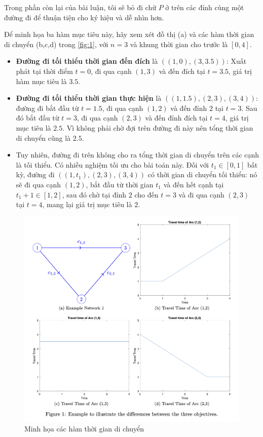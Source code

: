 \documentclass[../main.tex]{subfiles}
\begin{document}
Trong phần còn lại của bài luận, tôi sẽ bỏ đi chữ \(P\) ở trên các đỉnh cùng một đường đi để thuận tiện cho ký hiệu và dễ nhìn
hơn.

Để minh họa ba hàm mục tiêu này, hãy xem xét đồ thị (a) và các hàm thời
gian di chuyển (b,c,d) trong \autoref{fig:1}, với \(n = 3\) và khung thời gian
cho trước là \([0, 4]\).

\begin{itemize}
\tightlist
\item
  \textbf{Đường đi tối thiểu thời gian đến đích} là
  \(((1, 0), (3, 3.5))\): Xuất phát tại thời điểm \(t = 0\), đi qua cạnh
  \((1, 3)\) và đến đích tại \(t = 3.5\), giá trị hàm mục tiêu là
  \(3.5\).
\item
  \textbf{Đường đi tối thiểu thời gian thực hiện} là
  \(((1, 1.5), (2, 3), (3, 4))\): đường đi bắt đầu từ \(t = 1.5\), đi
  qua cạnh \((1, 2)\) và đến đỉnh \(2\) tại \(t = 3\). Sau đó bắt đầu từ
  \(t = 3\), đi qua cạnh \((2, 3)\) và đến đỉnh đích tại \(t = 4\), giá
  trị mục tiêu là \(2.5\). Vì không phải chờ đợi trên đường đi này nên
  tổng thời gian di chuyển cũng là \(2.5\).
\item
  Tuy nhiên, đường đi trên không cho ra tổng thời gian di chuyển trên
  các cạnh là tối thiểu. Có nhiều nghiệm tối ưu cho bài toán này. Đối
  với \(t_1 \in [0, 1]\) bất kỳ, đường đi \(((1, t_1), (2, 3), (3, 4))\)
  có thời gian di chuyển tối thiểu: nó sẽ đi qua cạnh \((1, 2)\), bắt
  đầu từ thời gian \(t_1\) và đến hết cạnh tại \(t_1 + 1 \in [1, 2]\),
  sau đó chờ tại đỉnh \(2\) cho đến \(t = 3\) và đi qua cạnh \((2, 3)\)
  tại \(t = 4\), mang lại giá trị mục tiêu là \(2\).
\end{itemize}

\begin{figure}
\centering
\includegraphics{images/Figure1.png}
\caption{Minh họa các hàm thời gian di chuyển}
\label{fig:1}
\end{figure}
\end{document}
